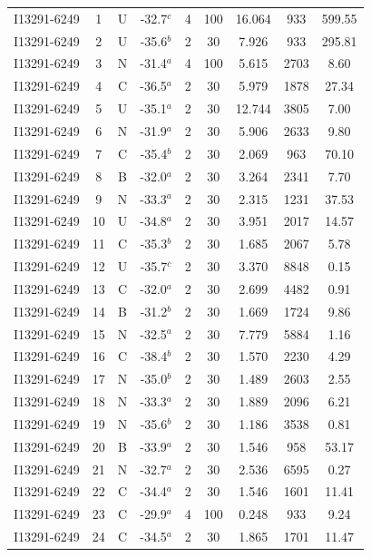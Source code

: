 \begin{table}
\begin{tabular}{ccccccccc}
I13291-6249 & 1 & U & -32.7$^{c}$ & 4 & 100 & 16.064 & 933 & 599.55 \\
I13291-6249 & 2 & U & -35.6$^{b}$ & 2 & 30 & 7.926 & 933 & 295.81 \\
I13291-6249 & 3 & N & -31.4$^{a}$ & 4 & 100 & 5.615 & 2703 & 8.60 \\
I13291-6249 & 4 & C & -36.5$^{a}$ & 2 & 30 & 5.979 & 1878 & 27.34 \\
I13291-6249 & 5 & U & -35.1$^{a}$ & 2 & 30 & 12.744 & 3805 & 7.00 \\
I13291-6249 & 6 & N & -31.9$^{a}$ & 2 & 30 & 5.906 & 2633 & 9.80 \\
I13291-6249 & 7 & C & -35.4$^{b}$ & 2 & 30 & 2.069 & 963 & 70.10 \\
I13291-6249 & 8 & B & -32.0$^{a}$ & 2 & 30 & 3.264 & 2341 & 7.70 \\
I13291-6249 & 9 & N & -33.3$^{a}$ & 2 & 30 & 2.315 & 1231 & 37.53 \\
I13291-6249 & 10 & U & -34.8$^{a}$ & 2 & 30 & 3.951 & 2017 & 14.57 \\
I13291-6249 & 11 & C & -35.3$^{b}$ & 2 & 30 & 1.685 & 2067 & 5.78 \\
I13291-6249 & 12 & U & -35.7$^{c}$ & 2 & 30 & 3.370 & 8848 & 0.15 \\
I13291-6249 & 13 & C & -32.0$^{a}$ & 2 & 30 & 2.699 & 4482 & 0.91 \\
I13291-6249 & 14 & B & -31.2$^{b}$ & 2 & 30 & 1.669 & 1724 & 9.86 \\
I13291-6249 & 15 & N & -32.5$^{a}$ & 2 & 30 & 7.779 & 5884 & 1.16 \\
I13291-6249 & 16 & C & -38.4$^{b}$ & 2 & 30 & 1.570 & 2230 & 4.29 \\
I13291-6249 & 17 & N & -35.0$^{b}$ & 2 & 30 & 1.489 & 2603 & 2.55 \\
I13291-6249 & 18 & N & -33.3$^{a}$ & 2 & 30 & 1.889 & 2096 & 6.21 \\
I13291-6249 & 19 & N & -35.6$^{b}$ & 2 & 30 & 1.186 & 3538 & 0.81 \\
I13291-6249 & 20 & B & -33.9$^{a}$ & 2 & 30 & 1.546 & 958 & 53.17 \\
I13291-6249 & 21 & N & -32.7$^{a}$ & 2 & 30 & 2.536 & 6595 & 0.27 \\
I13291-6249 & 22 & C & -34.4$^{a}$ & 2 & 30 & 1.546 & 1601 & 11.41 \\
I13291-6249 & 23 & C & -29.9$^{a}$ & 4 & 100 & 0.248 & 933 & 9.24 \\
I13291-6249 & 24 & C & -34.5$^{a}$ & 2 & 30 & 1.865 & 1701 & 11.47 \\

\end{tabular}
\end{table}
